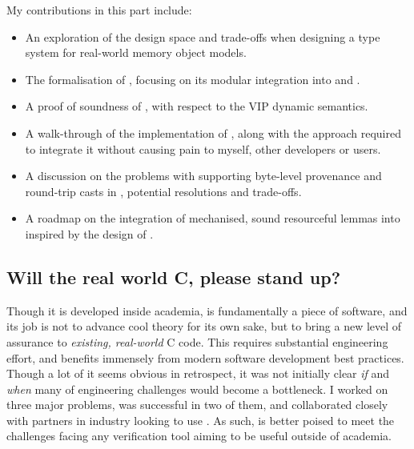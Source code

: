 My contributions in this part include:
\begin{itemize}
    \item An exploration of the design space and trade-offs when designing a
        type system for real-world memory object models.
    \item The formalisation of , focusing on its modular integration into
         and .
    \item A proof of soundness of , with respect to the VIP dynamic semantics.
    \item A walk-through of the implementation of , along with the
        approach required to integrate it without causing pain to myself, other
        developers or users.
    \item A discussion on the problems with supporting byte-level provenance
        and round-trip casts in , potential resolutions and trade-offs.
    \item A roadmap on the integration of mechanised, sound resourceful lemmas
        into  inspired by the design of .
\end{itemize}

\subsection{Will the real world C, please stand up?}

Though it is developed inside academia,  is fundamentally a piece of
software, and its job is not to advance cool theory for its own sake, but to
bring a new level of assurance to \emph{existing, real-world}  C
code. This requires substantial engineering effort, and benefits immensely from
modern software development best practices. Though a lot of it seems obvious in
retrospect, it was not initially clear \emph{if} and \emph{when} many of
engineering challenges would become a bottleneck. I worked on three major
problems, was successful in two of them, and collaborated closely with partners
in industry looking to use . As such,  is better poised to meet
the challenges facing any verification tool aiming to be useful outside of
academia.

